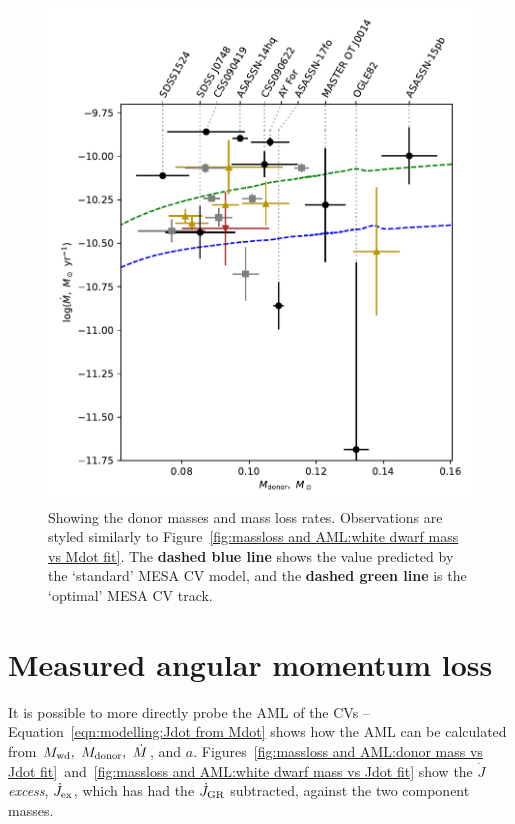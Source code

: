 \begin{figure}
    \centering
    \includegraphics[width=\textwidth]{figures/results/Mdot/Mr_Mdot_nofit.pdf}
    \caption{Showing the donor masses and mass loss rates. Observations are styled similarly to Figure~\ref{fig:massloss and AML:white dwarf mass vs Mdot fit}. The {\bf dashed blue line} shows the value predicted by the `standard' MESA CV model, and the {\bf dashed green line} is the `optimal' MESA CV track.}
    \label{fig:massloss and AML:donor mass vs Mdot fit}
\end{figure}



\newpage
\section{Measured angular momentum loss}
\label{sect:massloss and AML:measured angular momentum loss discussion}

It is possible to more directly probe the AML of the CVs -- Equation~\ref{eqn:modelling:Jdot from Mdot} shows how the AML can be calculated from $M_{\rm wd},\ M_{\rm donor},\ \dot M$, and $a$.
Figures~\ref{fig:massloss and AML:donor mass vs Jdot fit}~and~\ref{fig:massloss and AML:white dwarf mass vs Jdot fit} show the $\dot J$ \textit{excess}, $\dot J_{\rm ex}$, which has had the $\dot J_{\rm GR}$ subtracted, against the two component masses.

